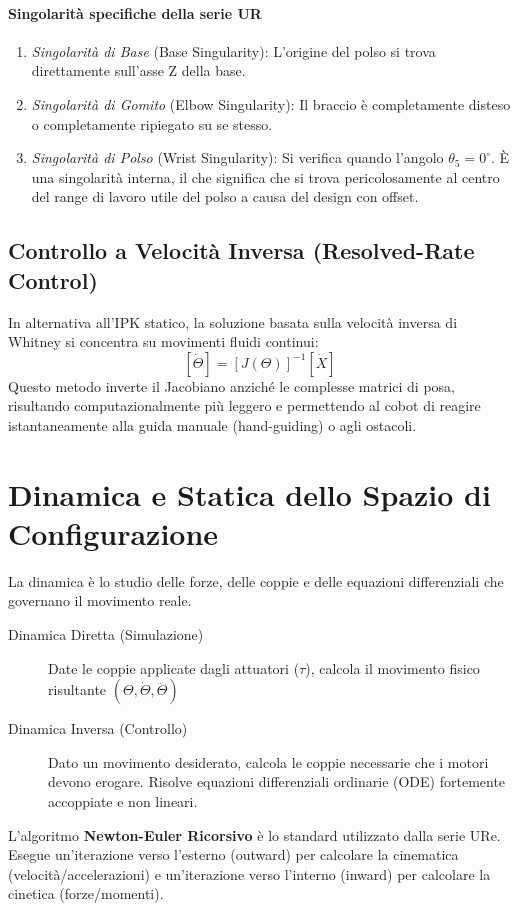 \paragraph{Singolarità specifiche della serie UR}
\begin{enumerate}
    \item \emph{Singolarità di Base} (Base Singularity): L'origine del polso si trova direttamente sull'asse Z della base.
    \item \emph{Singolarità di Gomito} (Elbow Singularity): Il braccio è completamente disteso o completamente ripiegato su se stesso.
    \item \emph{Singolarità di Polso} (Wrist Singularity): Si verifica quando l'angolo $\theta_5 = 0^\circ$. È una singolarità interna, il che significa che si trova pericolosamente al centro del range di lavoro utile del polso a causa del design con offset.
\end{enumerate}

%
\subsection{Controllo a Velocità Inversa (Resolved-Rate Control)}
In alternativa all'IPK statico, la soluzione basata sulla velocità inversa di Whitney si concentra su movimenti fluidi continui:
\[
    [\dot{\Theta}] = [J(\Theta)]^{-1}[\dot{X}]
\]
Questo metodo inverte il Jacobiano anziché le complesse matrici di posa, risultando computazionalmente più leggero e permettendo al cobot di reagire istantaneamente alla guida manuale (hand-guiding) o agli ostacoli.

%
\section{Dinamica e Statica dello Spazio di Configurazione}
La dinamica è lo studio delle forze, delle coppie e delle equazioni differenziali che governano il movimento reale.
\begin{description}
    \item [Dinamica Diretta (Simulazione)] Date le coppie applicate dagli attuatori ($\tau$), calcola il movimento fisico risultante $(\Theta, \dot{\Theta}, \ddot{\Theta})$
    \item [Dinamica Inversa (Controllo)] Dato un movimento desiderato, calcola le coppie necessarie che i motori devono erogare. Risolve equazioni differenziali ordinarie (ODE) fortemente accoppiate e non lineari.
\end{description}
L'algoritmo \textbf{Newton-Euler Ricorsivo} è lo standard utilizzato dalla serie URe. Esegue un'iterazione verso l'esterno (outward) per calcolare la cinematica (velocità/accelerazioni) e un'iterazione verso l'interno (inward) per calcolare la cinetica (forze/momenti).

